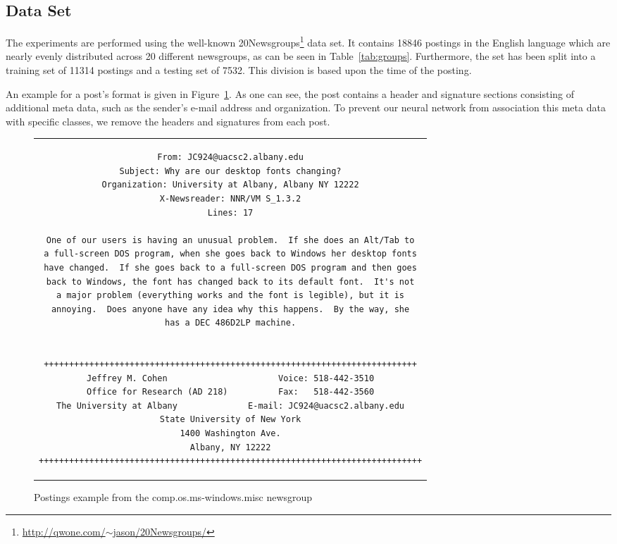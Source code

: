 \documentclass[sigconf]{acmart}
\begin{document}
\subsection{Data Set}

The experiments are performed using the well-known 20Newsgroups\footnote{\href{http://qwone.com/~jason/20Newsgroups/}{http://qwone.com/$\sim$jason/20Newsgroups/}} data set. It contains 18846 postings in the English language which are nearly evenly distributed across 20 different newsgroups, as can be seen in Table~\ref{tab:groups}. Furthermore, the set has been split into a training set of 11314 postings and a testing set of 7532. This division is based upon the time of the posting\cite{sklearn-newsgroup}.

An example for a post's format is given in Figure~\ref{fig:post}. As one can see, the post contains a header and signature sections consisting of additional meta data, such as the sender's e-mail address and organization. To prevent our neural network from association this meta data with specific classes, we remove the headers and signatures from each post.

\begin{figure}
	\label{fig:post}
	\begin{center}
		\begin{tabular}{c}
			\begin{lstlisting}[basicstyle=\footnotesize]
From: JC924@uacsc2.albany.edu
Subject: Why are our desktop fonts changing?
Organization: University at Albany, Albany NY 12222
X-Newsreader: NNR/VM S_1.3.2
Lines: 17

One of our users is having an unusual problem.  If she does an Alt/Tab to
a full-screen DOS program, when she goes back to Windows her desktop fonts
have changed.  If she goes back to a full-screen DOS program and then goes
back to Windows, the font has changed back to its default font.  It's not
a major problem (everything works and the font is legible), but it is
annoying.  Does anyone have any idea why this happens.  By the way, she
has a DEC 486D2LP machine.


++++++++++++++++++++++++++++++++++++++++++++++++++++++++++++++++++++++++++
Jeffrey M. Cohen                      Voice: 518-442-3510
Office for Research (AD 218)          Fax:   518-442-3560
The University at Albany              E-mail: JC924@uacsc2.albany.edu
State University of New York
1400 Washington Ave.
Albany, NY 12222
++++++++++++++++++++++++++++++++++++++++++++++++++++++++++++++++++++++++++++
			\end{lstlisting}
		\end{tabular}
	\end{center}
	\caption{Postings example from the comp.os.ms-windows.misc newsgroup}
\end{figure}
\end{document}
